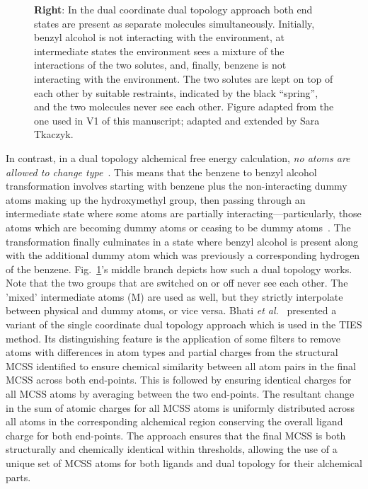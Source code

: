 \documentclass[9pt,bestpractices]{livecoms}
\begin{document}
\begin{figure}
{      %
\textbf{Right}: In the dual coordinate dual topology approach both end states are present as separate molecules simultaneously.  Initially, benzyl alcohol is not interacting with the environment, at intermediate states the environment sees a mixture of the interactions of the two solutes, and, finally, benzene is not interacting with the environment. The two solutes are kept on top of each other by suitable restraints, indicated by the black ``spring'', and  the two molecules never see each other.  Figure adapted from the one used in V1 of this manuscript; adapted and extended by Sara Tkaczyk.
    }
    \label{fig:fig_topology}
\end{figure} 

In contrast, in a dual topology alchemical free energy calculation, \emph{no atoms are allowed to change type}~\cite{boresch1999role, shirts2012best}. This means that the benzene to benzyl alcohol transformation involves starting with benzene plus the non-interacting dummy atoms making up the hydroxymethyl group, then passing through an intermediate state where some atoms are partially interacting---particularly, those atoms which are becoming dummy atoms or ceasing to be dummy atoms~\cite{mobley2014blind}. The transformation finally culminates in a state where benzyl alcohol is present along with the additional dummy atom which was previously a corresponding hydrogen of the benzene. Fig.~\ref{fig:fig_topology}'s middle branch depicts how such a dual topology works. Note that the two groups that are switched on or off never see each other. The 'mixed' intermediate atoms (M) are used as well, but they strictly interpolate between physical and dummy atoms, or vice versa.
Bhati \textit{et al.}~\cite{bhati2017, bieniek2021} presented a variant of the single coordinate dual topology approach which is used in the TIES method. Its distinguishing feature is the application of some filters to remove atoms with differences in atom types and partial charges from the structural MCSS identified to ensure chemical similarity between all atom pairs in the final MCSS across both end-points. This is followed by ensuring identical charges for all MCSS atoms by averaging between the two end-points. The resultant change in the sum of atomic charges for all MCSS atoms is uniformly distributed across all atoms in the corresponding alchemical region conserving the overall ligand charge for both end-points. The approach ensures that the final MCSS is both structurally and chemically identical within thresholds, allowing the use of a unique set of MCSS atoms for both ligands and dual topology for their alchemical parts.
\end{document}
